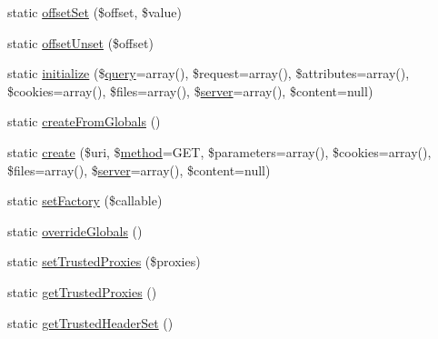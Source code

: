 \begin{DoxyCompactItemize}
\item 
static \mbox{\hyperlink{class_illuminate_1_1_support_1_1_facades_1_1_request_a152259a20338648884c97f30fceebec3}{offset\+Set}} (\$offset, \$value)
\item 
static \mbox{\hyperlink{class_illuminate_1_1_support_1_1_facades_1_1_request_a0a1207e664392d43d200cbcf94f0ecee}{offset\+Unset}} (\$offset)
\item 
static \mbox{\hyperlink{class_illuminate_1_1_support_1_1_facades_1_1_request_a48b56a8b2a03a51267ac34fd60d90766}{initialize}} (\$\mbox{\hyperlink{class_illuminate_1_1_support_1_1_facades_1_1_request_abaa6d157fd299de004ac80239a11aa5a}{query}}=array(), \$request=array(), \$attributes=array(), \$cookies=array(), \$files=array(), \$\mbox{\hyperlink{class_illuminate_1_1_support_1_1_facades_1_1_request_aaea79f85875a529d365d560bde09bf16}{server}}=array(), \$content=null)
\item 
static \mbox{\hyperlink{class_illuminate_1_1_support_1_1_facades_1_1_request_a09634cd14effd077c44a779500b8ff2c}{create\+From\+Globals}} ()
\item 
static \mbox{\hyperlink{class_illuminate_1_1_support_1_1_facades_1_1_request_a342ea9db43861f8dd293ff94bfa6b795}{create}} (\$uri, \$\mbox{\hyperlink{class_illuminate_1_1_support_1_1_facades_1_1_request_af4fe38392dfdd7f5daa7d2d811bad24d}{method}}=\textquotesingle{}G\+ET\textquotesingle{}, \$parameters=array(), \$cookies=array(), \$files=array(), \$\mbox{\hyperlink{class_illuminate_1_1_support_1_1_facades_1_1_request_aaea79f85875a529d365d560bde09bf16}{server}}=array(), \$content=null)
\item 
static \mbox{\hyperlink{class_illuminate_1_1_support_1_1_facades_1_1_request_a223c49b4b59ee06341172efbd2362139}{set\+Factory}} (\$callable)
\item 
static \mbox{\hyperlink{class_illuminate_1_1_support_1_1_facades_1_1_request_afd2c5e18dcee250f7de186821bf7afab}{override\+Globals}} ()
\item 
static \mbox{\hyperlink{class_illuminate_1_1_support_1_1_facades_1_1_request_a1686fbcf12f72ed06a19adf0633054fa}{set\+Trusted\+Proxies}} (\$proxies)
\item 
static \mbox{\hyperlink{class_illuminate_1_1_support_1_1_facades_1_1_request_ae27082de42e9584c5b87d6f4db424e2c}{get\+Trusted\+Proxies}} ()
\item 
static \mbox{\hyperlink{class_illuminate_1_1_support_1_1_facades_1_1_request_ae3ef3d27cc0d73a108b3f97e4568bd76}{get\+Trusted\+Header\+Set}} ()
\item 

\end{DoxyCompactItemize}
